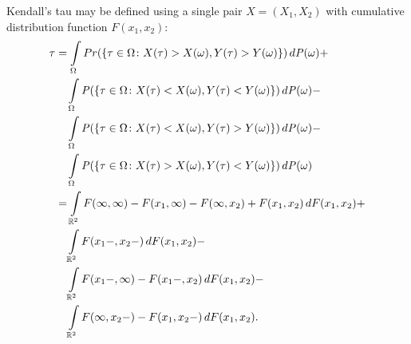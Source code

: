 \begin{rem}
  Kendall's tau may be defined using a single pair $X = (X_1, X_2)$
  with cumulative distribution function $F(x_1, x_2)$: \[
  \begin{split}
    \tau & = \int \limits_\Omega Pr(\{ \tau \in \Omega \colon X(\tau) >
    X(\omega), Y(\tau) > Y(\omega) \}) \, d\mathit{P}(\omega) + \\
    & \quad \int \limits_\Omega \mathit{P}(\{ \tau \in \Omega \colon X(\tau) <
    X(\omega), Y(\tau) < Y(\omega) \}) \, d\mathit{P}(\omega) - \\
    & \quad \int \limits_\Omega \mathit{P}(\{ \tau \in \Omega \colon X(\tau) <
    X(\omega), Y(\tau) > Y(\omega) \}) \, d\mathit{P}(\omega) - \\
    & \quad \int \limits_\Omega \mathit{P}(\{ \tau \in \Omega \colon X(\tau) >
    X(\omega), Y(\tau) < Y(\omega) \}) \, d\mathit{P}(\omega) \\
    & = \int \limits_{\mathbb{R}^2} F(\infty, \infty) - F(x_1, \infty) -
    F(\infty, x_2) + F(x_1, x_2) \, dF(x_1, x_2) + \\
    & \quad \int \limits_{\mathbb{R}^2} F(x_1-, x_2-) \, dF(x_1, x_2) - \\
    & \quad \int \limits_{\mathbb{R}^2} F(x_1-, \infty) - F(x_1-, x_2) \,
    dF(x_1, x_2) - \\
    & \quad \int \limits_{\mathbb{R}^2} F(\infty, x_2-) - F(x_1, x_2-) \,
    dF(x_1, x_2). \end{split} \]
\end{rem}
